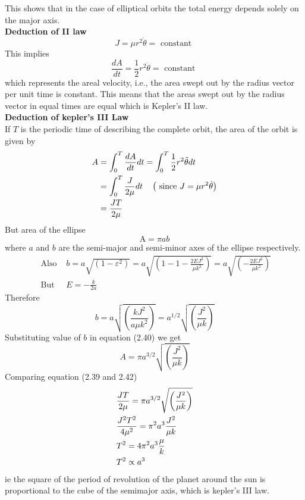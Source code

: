   This shows that in the case of elliptical orbits the total energy depends solely on the major axis.\\
  \textbf{Deduction of II law}\\
  $$J=\mu r^{2} \dot{\theta}=\text { constant }$$
  This implies
  $$
  \frac{d A}{d t}=\frac{1}{2} r^{2} \dot{\theta}=\text { constant }
  $$
  which represents the areal velocity, i.e., the area swept out by the radius vector per unit time is constant. This means that the areas swept out by the radius vector in equal times are equal which is Kepler's II law.\\
  \textbf{Deduction of kepler's III Law}\\
If $T$ is the periodic time of describing the complete orbit, the area of the orbit is given by\\
\begin{align}
A &=\int_{0}^{T} \frac{d A}{d t} d t=\int_{0}^{T} \frac{1}{2} r^{2} \ddot{\theta} d t \notag \\
&=\int_{0}^{T} \frac{J}{2 \mu} d t \quad\left(\text { since } J=\mu r^{2} \dot{\theta}\right) \notag \\
&=\frac{J T}{2 \mu}
\end{align}
But area of the ellipse 
\begin{equation}
\mathrm{A}=\pi a b
\end{equation}
where $a$ and $b$ are the semi-major and semi-minor axes of the ellipse respectively.
$$
\begin{array}{ll}
\text { Also } & b=a \sqrt{\left(1-\varepsilon^{2}\right)}=a \sqrt{\left(1-1-\frac{2 E J^{2}}{\mu k^{2}}\right)}=a \sqrt{\left(-\frac{2 E J^{2}}{\mu k^{2}}\right)} \\
\text { But } & E=-\frac{k}{2 a}
\end{array}
$$
Therefore
\begin{equation}
b=a \sqrt{\left(\frac{k J^{2}}{a \mu k^{2}}\right)}=a^{1 / 2} \sqrt{\left(\frac{J^{2}}{\mu k}\right)}
\end{equation}
Substituting value of $b$ in equation (2.40) we get
\begin{equation}
A=\pi a^{3 / 2} \sqrt{\left(\frac{J^{2}}{\mu k}\right)}
\end{equation}
Comparing equation (2.39 and 2.42)\\
\begin{align}
	&\frac{J T}{2 \mu}=\pi a^{3 / 2} \sqrt{\left(\frac{J^{2}}{\mu k}\right)} \notag \\
	&\frac{J^{2} T^{2}}{4 \mu^{2}}=\pi^{2} a^{3} \frac{J^{2}}{\mu k} \notag \\
	&T^{2}=4 \pi^{2} a^{3} \frac{\mu}{k} \notag \\
	&T^{2} \propto a^{3}
\end{align}
ie the square of the period of revolution of the planet around the sun is proportional to the cube of the semimajor axis, which is kepler's III law.
